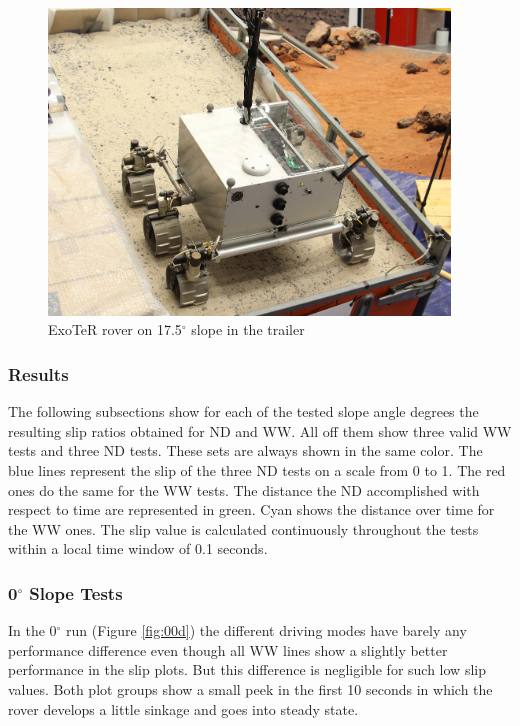 \documentclass[a4paper,twocolumn]{esapub2005} %
\begin{document}
\begin{figure}[h!]
    \centering
    \includegraphics[width=0.95\textwidth]{Exoslope.jpg}
    \caption{ExoTeR rover on 17.5$^{\circ}$ slope in the trailer}
    \label{fig:Exoslope}
\end{figure}

\subsubsection{Results} 
The following subsections show for each of the tested slope angle degrees the
resulting slip ratios obtained for ND and WW. All off them show three valid WW
tests and three ND tests. These sets are always shown in the same color. The
blue lines represent the slip of the three ND tests on a scale from 0 to 1. The
red ones do the same for the WW tests. The distance the ND accomplished with
respect to time are represented in green. Cyan shows the distance over time for
the WW ones. The slip value is calculated continuously throughout the tests
within a local time window of 0.1 seconds.

\subsubsection*{0$^{\circ}$ Slope Tests}
In the 0$^\circ$ run (Figure \ref{fig:00d}) the different driving modes have
barely any performance difference even though all WW lines show a slightly
better performance in the slip plots. But this difference is negligible for
such low slip values. Both plot groups show a small peek in the first 10
seconds in which the rover develops a little sinkage and goes into steady
state. 
\end{document}
